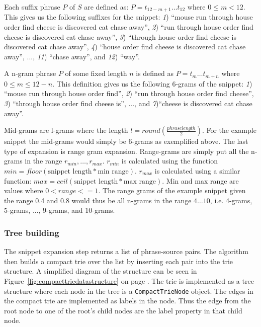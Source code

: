 Each suffix phrase \(P\)  of \(S\) are defined as: \(P = t_{12-m+1} \dots t_{12}\) where \(0 \le m < 12\). This gives us the following suffixes for the snippet: \textit{1}) ``mouse run through house order find cheese is discovered cat chase away'', \textit{2}) ``run through house order find cheese is discovered cat chase away'', \textit{3}) ``through house order find cheese is discovered cat chase away'', \textit{4}) ``house order find cheese is discovered cat chase away'', ..., \textit{11}) ``chase away'', and \textit{12}) ``way''.


A n-gram phrase \(P\) of some fixed length \(n\) is defined as \(P = t_{m} \dots t_{m+n}\) where \(0 \le m \le 12 - n\). This definition gives us the following 6-grams of the snippet: \textit{1}) ``mouse run through house order find'', \textit{2}) ``run through house order find cheese'', \textit{3}) ``through house order find cheese is'', ..., and \textit{7})``cheese is discovered cat chase away''.

Mid-grams are l-grams where the length \(l = round(\frac{phrase length}{2})\). For the example snippet the mid-grams would simply be 6-grams as exemplified above. The last type of expansion is range gram expansion. Range-grams are simply put all the n-grams in the range \(r_{min}, \dots, r_{max}\). \(r_{min}\) is calculated using the function \(min = floor(\text{snippet length} * \text{min~range})\). \(r_{max}\) is calculated using a similar function: \(max = ceil(\text{snippet length} * \text{max~range})\).  Min and max range are values where \(0 < range <= 1\). The range grams of the example snippet given the range 0.4 and 0.8 would thus be all n-grams in the range \(4 \dots 10\), i.e. 4-grams, 5-grams, ..., 9-grams, and 10-grams.

\subsubsection{Tree building}
The snippet expansion step returns a list of phrase-source pairs. The algorithm then builds a compact trie over the list by inserting each pair into the trie structure. A simplified diagram of the structure can be seen in Figure~\ref{fig:compacttriedatastructure} on page \pageref{fig:compacttriedatastructure}. The trie is implemented as a tree structure where each node in the tree is a \texttt{CompactTrieNode} object. The edges in the compact trie are implemented as labels in the node. Thus the edge from the root node to one of the root's child nodes are the label property in that child node.

